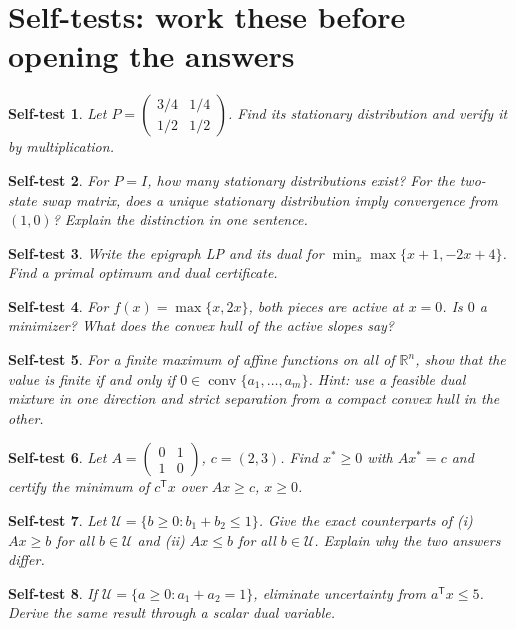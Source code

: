 \documentclass[11pt]{article}
\newcommand{\R}{\mathbb R}
\newcommand{\T}{^{\mathsf T}}
\newcommand{\conv}{\operatorname{conv}}
\newtheorem{exercise}{Self-test}
\begin{document}
\newpage
\section{Self-tests: work these before opening the answers}
\begin{exercise}
Let $P=\left(\begin{smallmatrix}3/4&1/4\\1/2&1/2\end{smallmatrix}\right)$.
Find its stationary distribution and verify it by multiplication.
\end{exercise}
\begin{exercise}
For $P=I$, how many stationary distributions exist? For the two-state
swap matrix, does a unique stationary distribution imply convergence
from $(1,0)$? Explain the distinction in one sentence.
\end{exercise}
\begin{exercise}
Write the epigraph LP and its dual for
$\min_x\max\{x+1,-2x+4\}$. Find a primal optimum and dual certificate.
\end{exercise}
\begin{exercise}
For $f(x)=\max\{x,2x\}$, both pieces are active at $x=0$.
Is $0$ a minimizer? What does the convex hull of the active slopes say?
\end{exercise}
\begin{exercise}
For a finite maximum of affine functions on all of $\R^n$, show that
the value is finite if and only if $0\in\conv\{a_1,\ldots,a_m\}$.
Hint: use a feasible dual mixture in one direction and strict separation
from a compact convex hull in the other.
\end{exercise}
\begin{exercise}
Let $A=\left(\begin{smallmatrix}0&1\\1&0\end{smallmatrix}\right)$,
$c=(2,3)$. Find $x^*\ge0$ with $Ax^*=c$ and certify the minimum of
$c\T x$ over $Ax\ge c$, $x\ge0$.
\end{exercise}
\begin{exercise}
Let $\mathcal U=\{b\ge0:b_1+b_2\le1\}$. Give the exact counterparts
of (i) $Ax\ge b$ for all $b\in\mathcal U$ and (ii) $Ax\le b$ for all
$b\in\mathcal U$. Explain why the two answers differ.
\end{exercise}
\begin{exercise}
If $\mathcal U=\{a\ge0:a_1+a_2=1\}$, eliminate uncertainty from
$a\T x\le5$. Derive the same result through a scalar dual variable.
\end{exercise}
\end{document}
